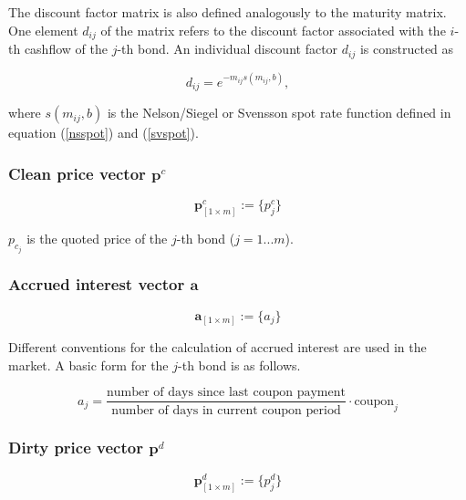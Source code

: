  The discount factor matrix is also defined analogously to the maturity matrix. One element $d_{ij}$ of the matrix refers to the discount factor associated with  the $i$-th cashflow of the $j$-th bond. An individual discount factor $d_{ij}$ is constructed as

\begin{displaymath}
d_{ij}=e^{-m_{ij}s(m_{ij},b)},
\end{displaymath}

where $s(m_{ij},b)$ is the Nelson/Siegel or Svensson spot rate function defined in equation (\ref{nsspot}) and (\ref{svspot}).

\subsubsection*{Clean price vector $\bm{p}^c$}

  \begin{equation}\label{pc}
\bm{p}^c_{\left[1\times m\right]}:= \{p^c_j\}
\end{equation}

$p_{c_j}$ is the quoted price of the $j$-th bond ($j=1...m$).

\subsubsection*{Accrued interest vector $\bm{a}$}

  \begin{equation}\label{a}
\bm{a}_{\left[1\times m\right]}:= \{a_j\}
\end{equation}

Different conventions for the calculation of accrued interest are used in the market. A basic form for the $j$-th bond is as follows.

\begin{equation}
    a_j= \frac{\mbox{number of days since last coupon payment}}{\mbox{number of days in current coupon period}}\cdot \mbox{coupon}_j
\end{equation}
 	

\subsubsection*{Dirty price vector $\bm{p}^d$}

\begin{equation}\label{pd}
    \bm{p}^d_{\left[1\times m\right]}:= \{p^d_j\}
\end{equation}

